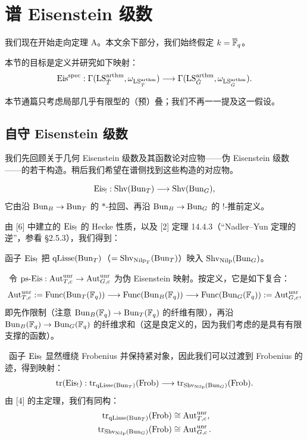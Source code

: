 \section{谱 Eisenstein 级数}

我们现在开始走向定理 A。本文余下部分，我们始终假定 $k = \overline{\mathbb{F}}_q$。

本节的目标是定义并研究如下映射：
\[
  \mathrm{Eis}^{\mathrm{spec}} : \Gamma(\mathrm{LS}^{\mathrm{arthm}}_{\check{T}}, \omega_{\mathrm{LS}^{\mathrm{arthm}}_{\check{T}}}) \longrightarrow
  \Gamma(\mathrm{LS}^{\mathrm{arthm}}_{\check{G}}, \omega_{\mathrm{LS}^{\mathrm{arthm}}_{\check{G}}}).
\]

本节通篇只考虑局部几乎有限型的（预）叠；我们不再一一提及这一假设。

\subsection{自守 Eisenstein 级数}

我们先回顾关于几何 Eisenstein 级数及其函数论对应物——伪 Eisenstein 级数——的若干构造。稍后我们希望在谱侧找到这些构造的对应物。

\[
  \mathrm{Eis}_! : \mathrm{Shv}(\mathrm{Bun}_T) \longrightarrow \mathrm{Shv}(\mathrm{Bun}_G),
\]
它由沿 $\mathrm{Bun}_B \to \mathrm{Bun}_T$ 的 $*$-拉回、再沿 $\mathrm{Bun}_B \to \mathrm{Bun}_G$ 的 $!$-推前定义。

由 [6] 中建立的 $\mathrm{Eis}_!$ 的 Hecke 性质，以及 [2] 定理 14.4.3（“Nadler--Yun 定理的逆”，参看 §2.5.3），我们得到：

\begin{prop}
函子 $\mathrm{Eis}_!$ 把 $\mathrm{qLisse}(\mathrm{Bun}_T)$（$= \mathrm{Shv}_{\mathrm{Nilp}_T}(\mathrm{Bun}_T)$）映入 $\mathrm{Shv}_{\mathrm{Nilp}}(\mathrm{Bun}_G)$。
\end{prop}

\ 令 $\text{ps-Eis} : \operatorname{Aut}^{\mathrm{unr}}_{T,c} \to \operatorname{Aut}^{\mathrm{unr}}_{G,c}$ 为伪 Eisenstein 映射。按定义，它是如下复合：
\[
  \operatorname{Aut}^{\mathrm{unr}}_{T,c} := \mathrm{Func}(\mathrm{Bun}_T(\mathbb{F}_q)) \longrightarrow
  \mathrm{Func}(\mathrm{Bun}_B(\mathbb{F}_q)) \longrightarrow \mathrm{Func}(\mathrm{Bun}_G(\mathbb{F}_q)) := \operatorname{Aut}^{\mathrm{unr}}_{G,c},
\]
即先作限制（注意 $\mathrm{Bun}_B(\mathbb{F}_q) \to \mathrm{Bun}_T(\mathbb{F}_q)$ 的纤维有限），再沿 $\mathrm{Bun}_B(\mathbb{F}_q) \to \mathrm{Bun}_G(\mathbb{F}_q)$ 的纤维求和（这是良定义的，因为我们考虑的是具有有限支撑的函数）。

\ 函子 $\mathrm{Eis}_!$ 显然缠绕 Frobenius 并保持紧对象，因此我们可以过渡到 Frobenius 的迹，得到映射：
\[
  \operatorname{tr}(\mathrm{Eis}_!) : \operatorname{tr}_{\mathrm{qLisse}(\mathrm{Bun}_T)}(\mathrm{Frob}) \longrightarrow \operatorname{tr}_{\mathrm{Shv}_{\mathrm{Nilp}}(\mathrm{Bun}_G)}(\mathrm{Frob}).
\]
由 [4] 的主定理，我们有同构：
\begin{equation}
  \begin{aligned}
    \operatorname{tr}_{\mathrm{qLisse}(\mathrm{Bun}_T)}(\mathrm{Frob}) &\cong \operatorname{Aut}^{\mathrm{unr}}_{T,c},\\
    \operatorname{tr}_{\mathrm{Shv}_{\mathrm{Nilp}}(\mathrm{Bun}_G)}(\mathrm{Frob}) &\cong \operatorname{Aut}^{\mathrm{unr}}_{G,c}.
  \end{aligned}
\end{equation}

